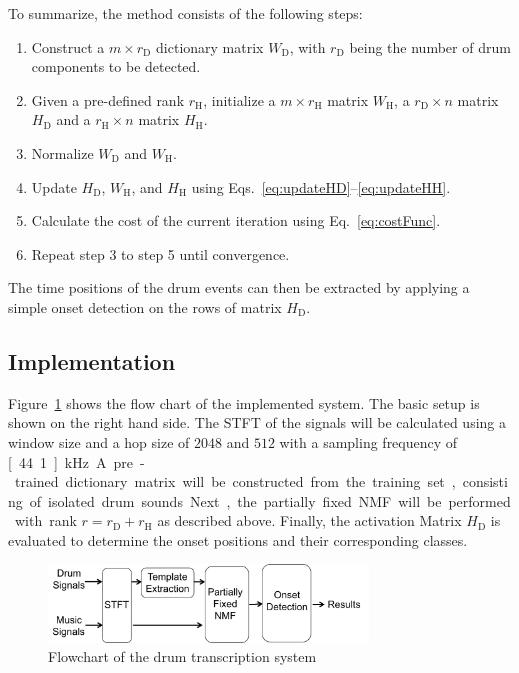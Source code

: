 \documentclass{article}
\newcommand{\figref}[1]{\mbox{Figure~\ref{#1}}}
\begin{document}
To summarize, the method consists of the following steps:
\begin{enumerate}
    \item   Construct a $m \times r_\mathrm{D}$ dictionary matrix $W_\mathrm{D}$, with $r_\mathrm{D}$ being the number of drum components to be detected.
    \item   Given a pre-defined rank $r_\mathrm{H}$, initialize a $m \times r_\mathrm{H}$ matrix $W_\mathrm{H}$, a $r_\mathrm{D} \times n$ matrix $H_\mathrm{D}$ and a $r_\mathrm{H} \times n$ matrix $H_\mathrm{H}$.
    \item   Normalize $W_\mathrm{D}$ and $W_\mathrm{H}$. 
    \item   Update $H_\mathrm{D}$, $W_\mathrm{H}$, and $H_\mathrm{H}$ using Eqs.~\eqref{eq:updateHD}--\eqref{eq:updateHH}.
    \item   Calculate the cost of the current iteration using Eq.~\eqref{eq:costFunc}.
    \item   Repeat step 3 to step 5 until convergence.
\end{enumerate}
The time positions of the drum events can then be extracted by applying a simple onset detection on the rows of matrix $H_\mathrm{D}$.

\subsection{Implementation}\label{subsec:processing steps}

\figref{fig:flowchart} shows the flow chart of the implemented system. The basic setup is shown on the right hand side. 
The STFT of the signals will be calculated using a window size and a hop size of $2048$ and $512$ with a sampling frequency of \unit[44.1]{kHz}. 
A pre-trained dictionary matrix will be constructed from the training set, consisting of isolated drum sounds. 
Next, the partially fixed NMF will be performed with rank $r = r_\mathrm{D} + r_\mathrm{H}$ as described above. 
Finally, the activation Matrix $H_\mathrm{D}$ is evaluated to determine the onset positions and their corresponding classes.  

\begin{figure}
 \centerline{%
 \includegraphics[width=8.5cm]{flowchart.png}}%
 \caption{Flowchart of the drum transcription system} %
 \label{fig:flowchart}
\end{figure}
\end{document}

